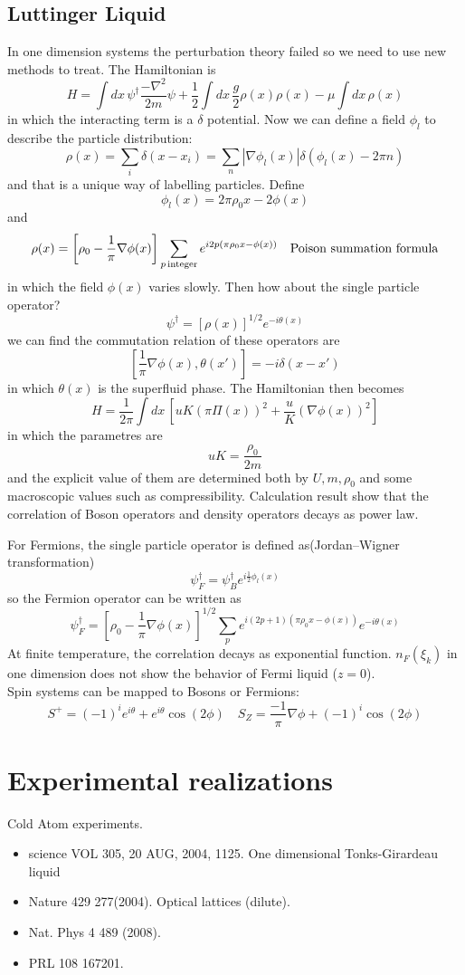 \documentclass{article}
\begin{document}
\subsection{Luttinger Liquid}
In one dimension systems the perturbation theory failed so we need to use new methods to treat. The Hamiltonian is
$$
H = \int dx \, \psi^\dagger\frac{-\nabla^2}{2m}\psi + \frac{1}{2}\int dx\,\frac{g}{2} \rho(x)\rho(x) -\mu\int dx \, \rho(x)
$$
in which the interacting term is a $\delta$ potential. Now we can define a field $\phi_l$ to describe the particle distribution:
$$
\rho(x) = \sum_ i \delta(x-x_i) = \sum_n|\nabla\phi_l(x)|\delta(\phi_l(x)-2\pi n)
$$
and that is a unique way of labelling particles.
Define
$$
\phi_l(x) = 2\pi\rho_0 x -2\phi(x)
$$
and 
$$
\rho(x) = \left[\rho_0-\frac{1}{\pi}\nabla\phi(x)\right]\sum_{p\textrm{\,integer}} e^{i2p(\pi\rho_0x-\phi(x))}\quad \textrm{Poison summation formula}
$$
in which the field $\phi(x)$ varies slowly. Then how about the single particle operator?
$$
\psi^\dagger = [\rho(x)]^{1/2}e^{-i\theta(x)}
$$
we can find the commutation relation of these operators are
$$
\left[\frac{1}{\pi}\nabla\phi(x),\theta(x')\right] = -i\delta(x-x')
$$
in which $\theta(x)$ is the superfluid phase. The Hamiltonian then becomes
$$
H = \frac{1}{2\pi}\int dx\, \left[uK(\pi\Pi(x))^2+\frac{u}{K}(\nabla\phi(x))^2\right]
$$
in which the parametres are
$$
uK = \frac{\rho_0}{2m}
$$
and the explicit value of them are determined both by $U, m, \rho_0$ and some macroscopic values such as compressibility. Calculation result show that the correlation of Boson operators and density operators decays as power law.

For Fermions, the single particle operator is defined as(Jordan–Wigner transformation)
$$
\psi_F^\dagger = \psi_B^\dagger e^{i\frac{1}{2}\phi_l(x)}
$$
so the Fermion operator can be written as
$$
\psi^\dagger_F = \left[\rho_0-\frac{1}{\pi}\nabla\phi(x)\right]^{1/2}\sum_p e^{i(2p+1)(\pi\rho_0x-\phi(x))}e^{-i\theta(x)}
$$
At finite temperature, the correlation decays as exponential function. $n_F(\xi_k)$ in one dimension does not show the behavior of Fermi liquid ($z=0$).\\ Spin systems can be mapped to Bosons or Fermions:
$$
S^+ = (-1)^i e^{i\theta}+e^{i\theta}\cos{(2\phi)}\quad S_Z = \frac{-1}{\pi}\nabla\phi+(-1)^i \cos{(2\phi)}
$$

\section{Experimental realizations}
Cold Atom experiments. 
\begin{itemize}
\item science VOL 305, 20 AUG, 2004, 1125. One dimensional Tonks-Girardeau liquid
\item Nature 429 277(2004). Optical lattices (dilute).
\item Nat. Phys 4 489 (2008).
\item PRL 108 167201. 
\end{itemize}
\end{document}
